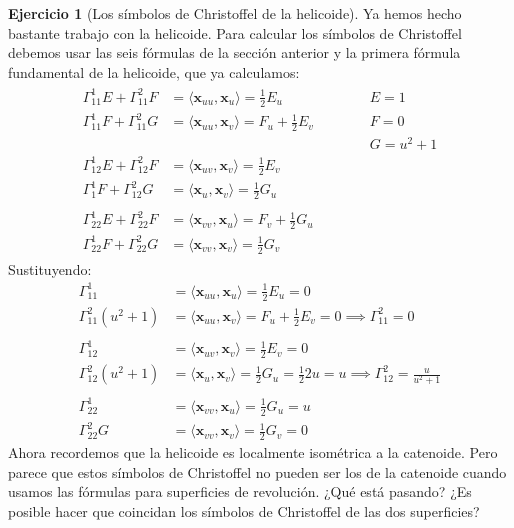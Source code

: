 \documentclass[spanish]{book}
\theoremstyle{definition}
\newtheorem*{ejer}{Ejercicio}
\begin{document}
\begin{ejer}[Los símbolos de Christoffel de la helicoide]
	Ya hemos hecho bastante trabajo con la helicoide. Para calcular los símbolos de Christoffel debemos usar las seis fórmulas de la sección anterior y la primera fórmula fundamental de la helicoide, que ya calculamos:
	\begin{align*}
	\begin{matrix}
		\Gamma^1_{11}E+\Gamma^2_{11}F&=\langle \mathbf x_{uu},\mathbf x_u\rangle=\frac{1}{2}E_u&&&&&E=1\\
		\Gamma^1_{11}F+\Gamma^2_{11}G&=\langle \mathbf x_{uu},\mathbf x_v\rangle=F_u+\frac{1}{2}E_v&&&&&F=0\\&&&&&&G=u^2+1\\
		\Gamma^1_{12}E+\Gamma^2_{12}F&=\langle \mathbf x_{uv},\mathbf x_v\rangle=\frac{1}{2}E_v\\
		\Gamma^1_{1}F+\Gamma^2_{12}G&=\langle \mathbf x_{u},\mathbf x_v\rangle=\frac{1}{2}G_u\\ \\
		\Gamma^1_{22}E+\Gamma^2_{22}F&=\langle \mathbf x_{vv},\mathbf x_u\rangle=F_v+\frac{1}{2}G_u\\
		\Gamma^1_{22}F+\Gamma^2_{22}G&=\langle \mathbf x_{vv},\mathbf x_v\rangle=\frac{1}{2}G_v
	\end{matrix}
	\end{align*}
	Sustituyendo:
	\begin{align*}
		\Gamma^1_{11}&=\langle \mathbf x_{uu},\mathbf x_u\rangle=\frac{1}{2}E_u=0\\
		\Gamma^2_{11}(u^2+1)&=\langle \mathbf x_{uu},\mathbf x_v\rangle=F_u+\frac{1}{2}E_v=0\implies \Gamma^2_{11}=0\\\\
		\Gamma^1_{12}&=\langle \mathbf x_{uv},\mathbf x_v\rangle=\frac{1}{2}E_v=0\\
		\Gamma^2_{12}(u^2+1)&=\langle \mathbf x_{u},\mathbf x_v\rangle=\frac{1}{2}G_u=\frac{1}{2}2u=u\implies\Gamma^2_{12}=\frac{u}{u^2+1}\\ \\
		\Gamma^1_{22}&=\langle \mathbf x_{vv},\mathbf x_u\rangle=\frac{1}{2}G_u=u\\
		\Gamma^2_{22}G&=\langle \mathbf x_{vv},\mathbf x_v\rangle=\frac{1}{2}G_v=0
	\end{align*}
	Ahora recordemos que la helicoide es localmente isométrica a la catenoide. Pero parece que estos símbolos de Christoffel no pueden ser los de la catenoide cuando usamos las fórmulas para superficies de revolución. ¿Qué está pasando? ¿Es posible hacer que coincidan los símbolos de Christoffel de las dos superficies?

\end{ejer}
\end{document}
